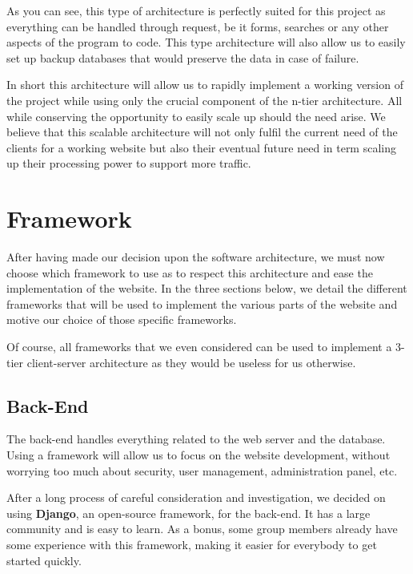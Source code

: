 As you can see, this type of architecture is perfectly suited for this
project as everything can be handled through request, be it forms, searches
or any other aspects of the program to code. This type architecture will
also allow us to easily set up backup databases that would preserve the
data in case of failure. \newline

In short this architecture will allow us to rapidly implement a working
version of the project while using only the crucial component of the n-tier
architecture. All while conserving the opportunity to easily scale up
should the need arise. We believe that this scalable architecture will not
only fulfil the current need of the clients for a working website but also
their eventual future need in term scaling up their processing power to
support more traffic.

\section{Framework}

After having made our decision upon the software architecture, we must now
choose which framework to use as to respect this architecture and ease the
implementation of the website. In the three sections below, we detail the
different frameworks that will be used to implement the various parts of
the website and motive our choice of those specific frameworks. \newline

Of course, all frameworks that we even considered can be used to implement
a 3-tier client-server architecture as they would be useless for us
otherwise.

\subsection{Back-End}

The back-end handles everything related to the web server and the database.
Using a framework will allow us to focus on the website development,
without worrying too much about security, user management, administration
panel, etc.\newline

After a long process of careful consideration and investigation, we decided
on using \textbf{Django}, an open-source framework, for the back-end. It
has a large community and is easy to learn. As a bonus, some group members
already have some experience with this framework, making it easier for
everybody to get started quickly.\newline


